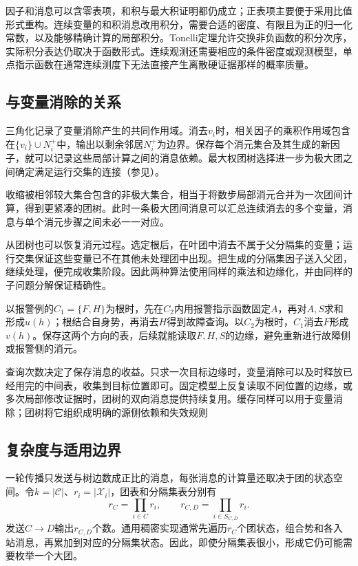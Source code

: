 因子和消息可以含零表项，和积与最大积证明都仍成立；正表项主要便于采用比值形式重构。连续变量的和积消息改用积分，需要合适的密度、有限且为正的归一化常数，以及能够精确计算的局部积分。Tonelli定理允许交换非负函数的积分次序，实际积分表达仍取决于函数形式。连续观测还需要相应的条件密度或观测模型，单点指示函数在通常连续测度下无法直接产生离散硬证据那样的概率质量。

\subsection{与变量消除的关系}
\label{sec:pgm-junction-tree-ve-relation}

三角化记录了变量消除产生的共同作用域。消去$v_i$时，相关因子的乘积作用域包含在$\{v_i\}\cup N_i^+$中，输出以剩余邻居$N_i^+$为边界。保存每个消元集合及其生成的新因子，就可以记录这些局部计算之间的消息依赖。最大权团树选择进一步为极大团之间确定满足运行交集的连接（参见）。

收缩被相邻较大集合包含的非极大集合，相当于将数步局部消元合并为一次团间计算，得到更紧凑的团树。此时一条极大团间消息可以汇总连续消去的多个变量，消息与单个消元步骤之间未必一一对应。

从团树也可以恢复消元过程。选定根后，在叶团中消去不属于父分隔集的变量；运行交集保证这些变量已不在其他未处理团中出现。把生成的分隔集因子送入父团，继续处理，便完成收集阶段。因此两种算法使用同样的乘法和边缘化，并由同样的子问题分解保证精确性。

以报警例的$C_1=\{F,H\}$为根时，先在$C_2$内用报警指示函数固定$A$，再对$A,S$求和形成$u(h)$；根结合自身势，再消去$H$得到故障查询。以$C_2$为根时，$C_1$消去$F$形成$v(h)$。保存这两个方向的表，后续就能读取$F,H,S$的边缘，避免重新进行故障侧或报警侧的消元。

查询次数决定了保存消息的收益。只求一次目标边缘时，变量消除可以及时释放已经用完的中间表，收集到目标位置即可。固定模型上反复读取不同位置的边缘，或多次局部修改证据时，团树的双向消息提供持续复用。缓存同样可以用于变量消除；团树将它组织成明确的源侧依赖和失效规则

\subsection{复杂度与适用边界}
\label{sec:pgm-junction-tree-complexity}

一轮传播只发送与树边数成正比的消息，每张消息的计算量还取决于团的状态空间。令$k=|\mathcal C|$、$r_i=|\mathcal X_i|$，团表和分隔集表分别有
\begin{equation}
  r_C=\prod_{i\in C}r_i,\qquad
  r_{C,D}=\prod_{i\in S_{C,D}}r_i.
  \label{eq:pgm-junction-tree-table-sizes}
\end{equation}
发送$C\to D$输出$r_{C,D}$个数。通用稠密实现通常先遍历$r_C$个团状态，组合势和各入站消息，再累加到对应的分隔集状态。因此，即使分隔集表很小，形成它仍可能需要枚举一个大团。

